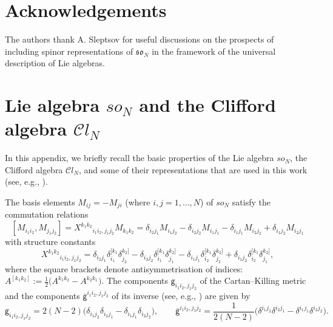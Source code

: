 \documentclass[a4paper]{article}
\newcommand{\Cl}{\mathcal{C}l}
\newcommand{\kg}{\mathsf{g}}
\renewcommand{\=}{\ =\ }
\newcommand{\okg}{\overline{\mathsf{g}}}
\numberwithin{equation}{section}
\theoremstyle{remark}
\begin{document}
\section*{Acknowledgements}
 The authors thank A. Sleptsov for useful discussions on the prospects of including spinor representations of $\mathfrak{so}_N$ in the framework of the universal description of Lie algebras.

\appendix

\section{Lie algebra $so_N$ and the Clifford algebra $\Cl_N$}\label{app: so_N and Cl_N props}

In this appendix, we briefly recall the basic properties of the Lie algebra $so_N$, the Clifford algebra $\Cl_N$, and some of their representations that are used in this work (see, e.g., \cite{IsRu1,IsRu2}).

The basis elements $M_{ij}=-M_{ji}$ (where $i,j=1,\dots,N$) of $so_N$ satisfy the commutation relations
\begin{equation}\label{soStructureRelations}
[M_{i_1i_2},M_{j_1j_2}] = X^{k_1k_2}{}_{i_1i_2,j_1j_2} M_{k_1k_2} = \delta_{i_2j_1}M_{i_1j_2} -\delta_{i_2j_2}M_{i_1j_1} -\delta_{i_1j_1}M_{i_2j_2} +\delta_{i_1j_2}M_{i_2j_1}
\end{equation}
with structure constants
\begin{equation}\label{soStructureConstants}
X^{k_1k_2}{}_{i_1i_2,j_1j_2} = \delta_{i_2j_1}\delta^{[k_1}_{i_1}\delta^{k_2]}_{j_2} -\delta_{i_2j_2}\delta^{[k_1}_{i_1}\delta^{k_2]}_{j_1} -\delta_{i_1j_1}\delta^{[k_1}_{i_2}\delta^{k_2]}_{j_2} +\delta_{i_1j_2}\delta^{[k_1}_{i_2}\delta^{k_2]}_{j_1},
\end{equation}
where the square brackets denote antisymmetrisation of indices: $A^{[k_1k_2]}:=\frac{1}{2}\bigl(A^{k_1k_2}-A^{k_2k_1}\bigr)$. The components $\kg_{i_1i_2,j_1j_2}$ of the Cartan--Killing metric and the components $\okg^{i_1i_2,j_1j_2}$ of its inverse (see, e.g., \cite{IsRu1}) are given by
\begin{equation}\label{soKillingMetric}
\kg_{i_1i_2,j_1j_2} = 2(N-2)\bigl(\delta_{i_1j_2}\delta_{i_2j_1}-\delta_{i_1j_1}\delta_{i_2j_2}\bigr), \qquad \okg^{i_1i_2,j_1j_2} = \frac{1}{2(N-2)} \bigl(\delta^{i_1j_2}\delta^{i_2j_1}-\delta^{i_1j_1}\delta^{i_2j_2}\bigr).
\end{equation}
\end{document}
